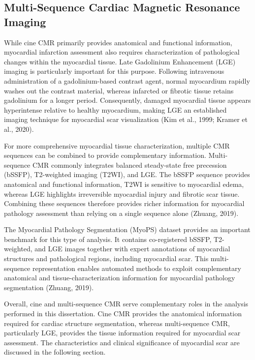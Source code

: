 \subsection{Multi-Sequence Cardiac Magnetic Resonance Imaging}
\label{subsec:multi-sequence}

While cine CMR primarily provides anatomical and functional information, myocardial infarction assessment also requires characterization of pathological changes within the myocardial tissue. Late Gadolinium Enhancement (LGE) imaging is particularly important for this purpose. Following intravenous administration of a gadolinium-based contrast agent, normal myocardium rapidly washes out the contrast material, whereas infarcted or fibrotic tissue retains gadolinium for a longer period. Consequently, damaged myocardial tissue appears hyperintense relative to healthy myocardium, making LGE an established imaging technique for myocardial scar visualization (Kim et al., 1999; Kramer et al., 2020).

For more comprehensive myocardial tissue characterization, multiple CMR sequences can be combined to provide complementary information. Multi-sequence CMR commonly integrates balanced steady-state free precession (bSSFP), T2-weighted imaging (T2WI), and LGE. The bSSFP sequence provides anatomical and functional information, T2WI is sensitive to myocardial edema, whereas LGE highlights irreversible myocardial injury and fibrotic scar tissue. Combining these sequences therefore provides richer information for myocardial pathology assessment than relying on a single sequence alone (Zhuang, 2019).

The Myocardial Pathology Segmentation (MyoPS) dataset provides an important benchmark for this type of analysis. It contains co-registered bSSFP, T2-weighted, and LGE images together with expert annotations of myocardial structures and pathological regions, including myocardial scar. 
This multi-sequence representation enables automated methods to exploit complementary anatomical and tissue-characterization information for myocardial pathology segmentation (Zhuang, 2019).

Overall, cine and multi-sequence CMR serve complementary roles in the analysis performed in this dissertation. Cine CMR provides the anatomical information required for cardiac structure segmentation, whereas multi-sequence CMR, particularly LGE, provides the tissue information 
required for myocardial scar assessment. The characteristics and clinical significance of myocardial scar are discussed in the following section.


